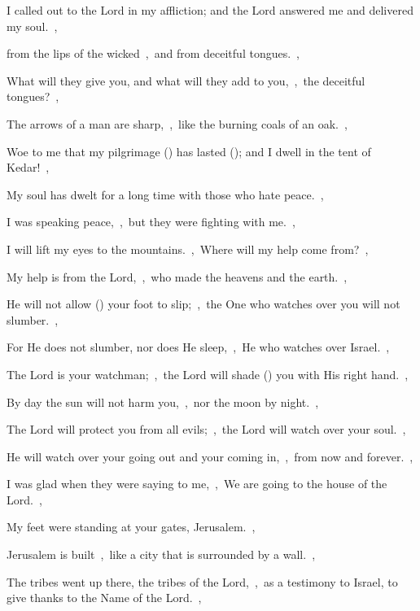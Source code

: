 \documentclass[12pt,twoside,a5paper]{article}
\begin{document}
\begin{halfparskip}
   I called out to the Lord in my affliction; and the Lord answered me and delivered my soul.~\sep


  from the lips of the wicked~\sep\ and from deceitful tongues.~\sep

  What will they give you, and what will they add to you,~\sep\ the deceitful tongues?~\sep

  The arrows of a man are sharp,~\sep\ like the burning coals of an oak.~\sep

  Woe to me that my pilgrimage () has lasted (); and I dwell in the tent of Kedar!~\sep

  My soul has dwelt for a long time with those who hate peace.~\sep

  I was speaking peace,~\sep\ but they were fighting with me.~\sep

   I will lift my eyes to the mountains.~\sep\ Where will my help come from?~\sep

  My help is from the Lord,~\sep\ who made the heavens and the earth.~\sep

  He will not allow () your foot to slip;~\sep\ the One who watches over you will not slumber.~\sep

  For He does not slumber, nor does He sleep,~\sep\ He who watches over Israel.~\sep

  The Lord is your watchman;~\sep\ the Lord will shade () you with His right hand.~\sep

  By day the sun will not harm you,~\sep\ nor the moon by night.~\sep

  The Lord will protect you from all evils;~\sep\ the Lord will watch over your soul.~\sep

  He will watch over your going out and your coming in,~\sep\ from now and forever.~\sep

   I was glad when they were saying to me,~\sep\ We are going to the house of the Lord.~\sep

  My feet were standing at your gates, Jerusalem.~\sep

  Jerusalem is built~\sep\ like a city that is surrounded by a wall.~\sep

  The tribes went up there, the tribes of the Lord,~\sep\ as a testimony to Israel, to give thanks to the Name of the Lord.~\sep


\end{halfparskip}
\end{document}
